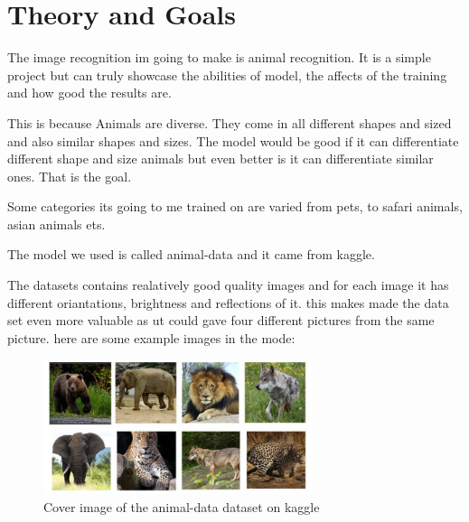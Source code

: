 \chapter{Theory and Goals}
The image recognition im going to make is animal recognition. It is a simple project but can truly showcase the abilities of model, the affects of the training and how good the results are.

This is because Animals are diverse. They come in all different  shapes and sized and also similar shapes and sizes. The model would be good if it can differentiate different shape and size animals but even better is it can differentiate similar ones. That is the goal.

Some categories its going to me trained on are varied from pets, to safari animals, asian animals ets. 

The model we used is called animal-data\cite{animal-data} and it came from kaggle.

The datasets contains realatively good quality images and for each image it has different oriantations, brightness and reflections of it. this makes made the data set even more valuable as ut could gave four different pictures from the same picture.
here are some example images in the mode:

\begin{figure}[h]
    \centering
    \includegraphics[width = 0.7\textwidth]{Figures/img/dataset-cover.png}
    \caption{Cover image of the animal-data\cite{animal-data} dataset on kaggle}
    \label{fig:label1}
\end{figure}